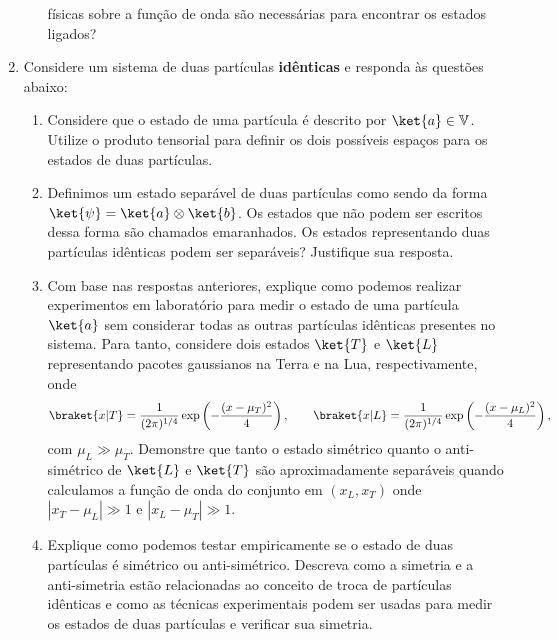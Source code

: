 \begin{enumerate}
\begin{enumerate}
		            físicas sobre a função de onda são necessárias para encontrar os estados
		            ligados?
	      \end{enumerate}
	\item Considere um sistema de duas partículas {\bf idênticas} e responda às questões
	      abaixo:
	      \begin{enumerate}
		      \item Considere que o estado de uma partícula é descrito por $\ket{a} \in
			            \mathbb{V}$. Utilize o produto tensorial para definir os dois possíveis
		            espaços para os estados de duas partículas.
		      \item Definimos um estado separável de duas partículas como sendo da forma
		            $\ket{\psi} = \ket{a}\otimes\ket{b}$. Os estados que não podem ser
		            escritos dessa forma são chamados emaranhados. Os estados representando
		            duas partículas idênticas podem ser separáveis? Justifique sua resposta.
		      \item Com base nas respostas anteriores, explique como podemos realizar
		            experimentos em laboratório para medir o estado de uma partícula
		            $\ket{a}$ sem considerar todas as outras partículas idênticas presentes no
		            sistema. Para tanto, considere dois estados $\ket{T}$ e $\ket{L}$
		            representando pacotes gaussianos na Terra e na Lua, respectivamente, onde
		            $$\braket{x|T} =
			            \frac{1}{(2\pi)^{1/4}}\exp\left(-\frac{(x-\mu_T)^2}{4}\right),
			            \qquad \braket{x|L} =
			            \frac{1}{(2\pi)^{1/4}}\exp\left(-\frac{(x-\mu_L)^2}{4}\right),$$ com
		            $\mu_L\gg\mu_T$. Demonstre que tanto o estado simétrico quanto o
		            anti-simétrico de $\ket{L}$ e $\ket{T}$ são aproximadamente
		            separáveis quando calculamos a função de onda do conjunto em $(x_L,
			            x_T)$ onde $|x_T-\mu_L|\gg1$ e $|x_L-\mu_T|\gg1$.
		      \item Explique como podemos testar empiricamente se o estado de duas
		            partículas é simétrico ou anti-simétrico. Descreva como a simetria e a
		            anti-simetria estão relacionadas ao conceito de troca de partículas
		            idênticas e como as técnicas experimentais podem ser usadas para medir os
		            estados de duas partículas e verificar sua simetria.
	      \end{enumerate}

\end{enumerate}



